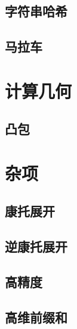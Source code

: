 \documentclass{article}
\begin{document}
\begin{multicols*}{3}
\subsection{字符串哈希}


\subsection{马拉车}


\section{计算几何}
\subsection{凸包}


\section{杂项}
\subsection{康托展开}


\subsection{逆康托展开}


\subsection{高精度}


\subsection{高维前缀和}


\end{multicols*}
\end{document}

